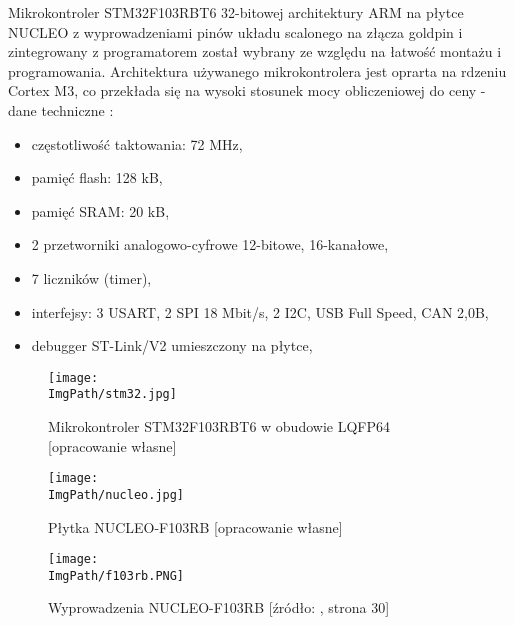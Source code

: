 \documentclass[a4paper,12pt,twoside,openany]{report}
\newcommand{\ImgPath}{.}
\begin{document}
Mikrokontroler STM32F103RBT6 32-bitowej architektury ARM na płytce NUCLEO z wyprowadzeniami pinów układu scalonego na złącza goldpin i zintegrowany z programatorem został wybrany ze względu na łatwość montażu i programowania. Architektura używanego mikrokontrolera jest oprarta na rdzeniu Cortex M3, co przekłada się na wysoki stosunek mocy obliczeniowej do ceny - dane techniczne \cite{nucleo,stm32datasheet}:
\begin{itemize}
\item częstotliwość taktowania: 72 MHz,
\item pamięć flash: 128 kB,
\item pamięć SRAM: 20 kB,
\item 2 przetworniki analogowo-cyfrowe 12-bitowe, 16-kanałowe,
\item 7 liczników (timer),
\item interfejsy: 3 USART, 2 SPI 18 Mbit/s, 2 I2C, USB Full Speed, CAN 2,0B,
\item debugger ST-Link/V2 umieszczony na płytce,
\end{itemize}

\begin{figure}[!htbp]
	\begin{center}
\centering
\texttt{[image: \\ImgPath/stm32.jpg]}
\end{center}
	\caption{Mikrokontroler STM32F103RBT6 w obudowie LQFP64 [opracowanie własne]}
	\label{schematKomunikacji}
\end{figure}

\begin{figure}[!htbp]
	\begin{center}
\centering
\texttt{[image: \\ImgPath/nucleo.jpg]}
\end{center}
	\caption{Płytka NUCLEO-F103RB [opracowanie własne]}
	\label{schematKomunikacji}
\end{figure}

\begin{figure}[!htbp]
	\begin{center}
\centering
\texttt{[image: \\ImgPath/f103rb.PNG]}
\end{center}
	\caption{Wyprowadzenia NUCLEO-F103RB [źródło: \cite{nucleo}, strona 30]}
	\label{schematKomunikacji}
\end{figure}

\newpage
\end{document}
